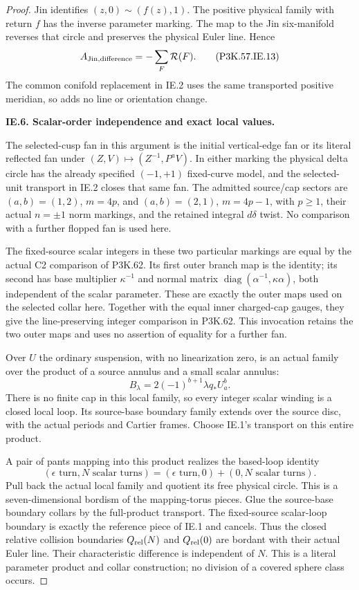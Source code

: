 \begin{proof}
Jin identifies \((z,0)\sim(f(z),1)\).
The positive physical family with return
\(f\) has the inverse parameter marking.
The map to the Jin six-manifold reverses
that circle and preserves the physical
Euler line. Hence
\[
                  A_{\rm Jin,difference}
                           =-\sum_F\mathcal R(F).         \tag{P3K.57.IE.13}
\]
The common conifold replacement in IE.2
uses the same transported positive
meridian, so adds no line or orientation
change.

\par\medskip\noindent\textbf{IE.6. Scalar-order independence and exact local values.}\par\nopagebreak[4]

The selected-cusp fan in this argument is the initial
vertical-edge fan or its literal reflected fan under
\((Z,V)\mapsto(Z^{-1},P^aV)\). In either marking the
physical delta circle has the already specified
\((-1,+1)\) fixed-curve model, and the selected-unit
transport in IE.2 closes that same fan. The admitted
source/cap sectors are \((a,b)=(1,2)\), \(m=4p\),
and \((a,b)=(2,1)\), \(m=4p-1\), with \(p\ge1\),
their actual \(n=\pm1\) norm markings, and the
retained integral \(d\delta\) twist. No comparison
with a further flopped fan is used here.

The fixed-source scalar integers in these two particular markings
are equal by the actual C2 comparison of P3K.62. Its first outer
branch map is the identity; its second has base multiplier
\(\kappa^{-1}\) and normal matrix
\(\operatorname{diag}(\alpha^{-1},\kappa\alpha)\), both independent
of the scalar parameter. These are exactly the outer maps used
on the selected collar here. Together with the equal inner
charged-cap gauges, they give the line-preserving integer
comparison in P3K.62. This invocation retains the two outer
maps and uses no assertion of equality for a further fan.

Over \(U\) the ordinary suspension, with
no linearization zero, is an actual family
over the product of a source annulus and
a small scalar annulus:
\[
                   B_\lambda=2(-1)^{b+1}\lambda q_*U_a^b.
\]
There is no finite cap in this local
family, so every integer scalar winding
is a closed local loop. Its source-base
boundary family extends over the source
disc, with the actual periods and Cartier
frames. Choose IE.1's transport on this
entire product.

A pair of pants mapping into this
product realizes the based-loop identity
\[
 (\epsilon\text{ turn},N\text{ scalar turns})
   =(\epsilon\text{ turn},0)+(0,N\text{ scalar turns}).    \tag{P3K.57.IE.14}
\]
Pull back the actual local family and
quotient its free physical circle.
This is a seven-dimensional bordism
of the mapping-torus pieces. Glue the
source-base boundary collars by the
full-product transport. The fixed-source
scalar-loop boundary is exactly the
reference piece of IE.1 and cancels.
Thus the closed relative collision
boundaries \(Q_{\rm rel}(N)\) and
\(Q_{\rm rel}(0)\) are bordant with
their actual Euler line. Their
characteristic difference is independent
of \(N\). This is a literal parameter
product and collar construction; no
division of a covered sphere class occurs.


\end{proof}
